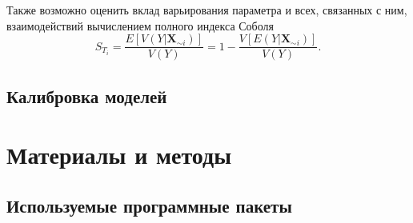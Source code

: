 \documentclass[a4paper,12pt]{article} %
\begin{document}
Также возможно оценить вклад варьирования параметра и всех, связанных с ним, взаимодействий вычислением полного индекса Соболя
\begin{displaymath}
S_{T_i}=\frac{E[V(Y|\bm{X}_{\sim i})]}{V(Y)}=1-\frac{V[E(Y|\bm{X}_{\sim i})]}{V(Y)}.
\end{displaymath}
\subsection{Калибровка моделей}


\section{Материалы и методы}
\subsection{Используемые программные пакеты}
\end{document}
